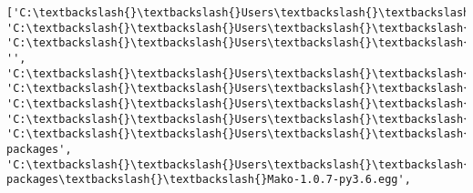 \documentclass[11pt]{article}
\begin{document}
    \begin{Verbatim}[commandchars=\\\{\}]
['C:\textbackslash{}\textbackslash{}Users\textbackslash{}\textbackslash{}sandr\textbackslash{}\textbackslash{}Documents\textbackslash{}\textbackslash{}GitHub\textbackslash{}\textbackslash{}src\textbackslash{}\textbackslash{}data', 'C:\textbackslash{}\textbackslash{}Users\textbackslash{}\textbackslash{}sandr\textbackslash{}\textbackslash{}Documents\textbackslash{}\textbackslash{}GitHub\textbackslash{}\textbackslash{}MLMortgage\textbackslash{}\textbackslash{}src\textbackslash{}\textbackslash{}models', 'C:\textbackslash{}\textbackslash{}Users\textbackslash{}\textbackslash{}sandr\textbackslash{}\textbackslash{}Documents\textbackslash{}\textbackslash{}GitHub\textbackslash{}\textbackslash{}MLMortgage\textbackslash{}\textbackslash{}src\textbackslash{}\textbackslash{}data', '', 'C:\textbackslash{}\textbackslash{}Users\textbackslash{}\textbackslash{}sandr\textbackslash{}\textbackslash{}AppData\textbackslash{}\textbackslash{}Local\textbackslash{}\textbackslash{}conda\textbackslash{}\textbackslash{}conda\textbackslash{}\textbackslash{}envs\textbackslash{}\textbackslash{}tensorflowenvironment\textbackslash{}\textbackslash{}python36.zip', 'C:\textbackslash{}\textbackslash{}Users\textbackslash{}\textbackslash{}sandr\textbackslash{}\textbackslash{}AppData\textbackslash{}\textbackslash{}Local\textbackslash{}\textbackslash{}conda\textbackslash{}\textbackslash{}conda\textbackslash{}\textbackslash{}envs\textbackslash{}\textbackslash{}tensorflowenvironment\textbackslash{}\textbackslash{}DLLs', 'C:\textbackslash{}\textbackslash{}Users\textbackslash{}\textbackslash{}sandr\textbackslash{}\textbackslash{}AppData\textbackslash{}\textbackslash{}Local\textbackslash{}\textbackslash{}conda\textbackslash{}\textbackslash{}conda\textbackslash{}\textbackslash{}envs\textbackslash{}\textbackslash{}tensorflowenvironment\textbackslash{}\textbackslash{}lib', 'C:\textbackslash{}\textbackslash{}Users\textbackslash{}\textbackslash{}sandr\textbackslash{}\textbackslash{}AppData\textbackslash{}\textbackslash{}Local\textbackslash{}\textbackslash{}conda\textbackslash{}\textbackslash{}conda\textbackslash{}\textbackslash{}envs\textbackslash{}\textbackslash{}tensorflowenvironment', 'C:\textbackslash{}\textbackslash{}Users\textbackslash{}\textbackslash{}sandr\textbackslash{}\textbackslash{}AppData\textbackslash{}\textbackslash{}Local\textbackslash{}\textbackslash{}conda\textbackslash{}\textbackslash{}conda\textbackslash{}\textbackslash{}envs\textbackslash{}\textbackslash{}tensorflowenvironment\textbackslash{}\textbackslash{}lib\textbackslash{}\textbackslash{}site-packages', 'C:\textbackslash{}\textbackslash{}Users\textbackslash{}\textbackslash{}sandr\textbackslash{}\textbackslash{}AppData\textbackslash{}\textbackslash{}Local\textbackslash{}\textbackslash{}conda\textbackslash{}\textbackslash{}conda\textbackslash{}\textbackslash{}envs\textbackslash{}\textbackslash{}tensorflowenvironment\textbackslash{}\textbackslash{}lib\textbackslash{}\textbackslash{}site-packages\textbackslash{}\textbackslash{}Mako-1.0.7-py3.6.egg', 
\end{Verbatim}
\end{document}

